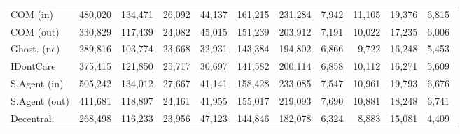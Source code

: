 \begin{table}[t]
\begin{tabular}{lrrrrrrrrrr}
COM (in) & 480,020 & 134,471 & 26,092 & 44,137 & 161,215 & 231,284 & 7,942 & 11,105 & 19,376 & 6,815 \\
COM (out) & 330,829 & 117,439 & 24,082 & 45,015 & 151,239 & 203,912 & 7,191 & 10,022 & 17,235 & 6,006 \\
Ghost. (nc) & 289,816 & 103,774 & 23,668 & 32,931 & 143,384 & 194,802 & 6,866 & 9,722 & 16,248 & 5,453 \\
IDontCare & 375,415 & 121,850 & 25,717 & 30,697 & 141,582 & 200,114 & 6,858 & 10,112 & 16,271 & 5,609 \\
S.Agent (in) & 505,242 & 134,012 & 27,667 & 41,141 & 158,428 & 233,085 & 7,547 & 10,961 & 19,793 & 6,676 \\
S.Agent (out) & 411,681 & 118,897 & 24,161 & 41,955 & 155,017 & 219,093 & 7,690 & 10,881 & 18,248 & 6,741 \\
Decentral. & 268,498 & 116,233 & 23,956 & 47,123 & 144,846 & 182,078 & 6,324 & 8,883 & 15,081 & 4,409 \\
\bottomrule
\end{tabular}
\end{table}